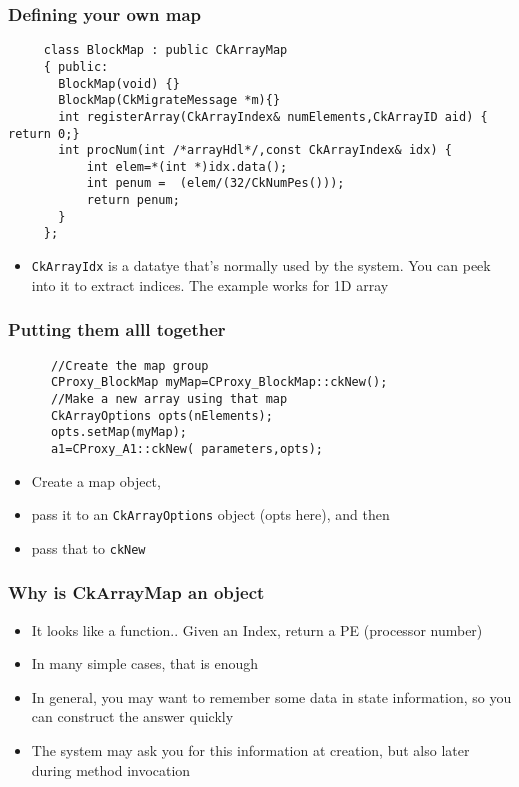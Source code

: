 \documentclass{beamer}
\begin{document}
\begin{frame}[fragile]
    \frametitle{Defining your own map}
    \begin{lstlisting}
     class BlockMap : public CkArrayMap
     { public:
       BlockMap(void) {}
       BlockMap(CkMigrateMessage *m){}
       int registerArray(CkArrayIndex& numElements,CkArrayID aid) { return 0;}
       int procNum(int /*arrayHdl*/,const CkArrayIndex& idx) {
           int elem=*(int *)idx.data();
           int penum =  (elem/(32/CkNumPes()));
           return penum;
       }
     };
    \end{lstlisting}
    \begin{itemize}
        \item \texttt{CkArrayIdx} is a datatye that’s normally used by the system. You
        can peek into it to extract indices. The example works for 1D array
    \end{itemize}
\end{frame}

\begin{frame}[fragile]
    \frametitle{Putting them alll together}
    \begin{lstlisting}
      //Create the map group
      CProxy_BlockMap myMap=CProxy_BlockMap::ckNew();
      //Make a new array using that map
      CkArrayOptions opts(nElements);
      opts.setMap(myMap);
      a1=CProxy_A1::ckNew( parameters,opts);
    \end{lstlisting}
    \begin{itemize}
    \item Create a map object, 
    \item pass it to an \texttt{CkArrayOptions} object (opts here), and then 
    \item pass that to \texttt{ckNew}
    \end{itemize}
\end{frame}

\begin{frame}[fragile]
    \frametitle{Why is CkArrayMap an object}
    \begin{itemize}
      \item It looks like a function.. Given an Index, return a PE (processor
      number)
      \item In many simple cases, that is enough
      \item In general, you may want to remember some data in state information, so you can construct the answer quickly
      \item The system may ask you for this information at creation, but also later during method invocation
    \end{itemize}
\end{frame}
\end{document}
